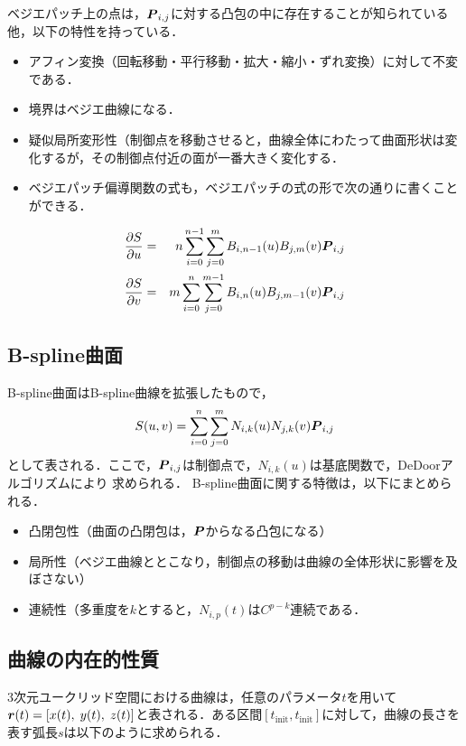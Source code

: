 		ベジエパッチ上の点は，$ \boldsymbol{P}_{i,j} $に対する凸包の中に存在することが知られている他，以下の特性を持っている．
		\begin{itemize}
			\item アフィン変換（回転移動・平行移動・拡大・縮小・ずれ変換）に対して不変である．
			\item 境界はベジエ曲線になる．
			\item 疑似局所変形性（制御点を移動させると，曲線全体にわたって曲面形状は変化するが，その制御点付近の面が一番大きく変化する．
			\item ベジエパッチ偏導関数の式も，ベジエパッチの式の形で次の通りに書くことができる．
		\end{itemize}
		\begin{eqnarray}
			\frac{\partial S}{\partial u} &=& n \sum_{i=0}^{n-1} \sum_{j=0}^m B_{i,n-1}(u) B_{j,m}(v) \boldsymbol{P}_{i,j}\\
			\frac{\partial S}{\partial v} &=& m \sum_{i=0}^{n} \sum_{j=0}^{m-1} B_{i,n}(u) B_{j,m-1}(v) \boldsymbol{P}_{i,j}
		\end{eqnarray}

		\subsection{B-spline曲面}
		B-spline曲面はB-spline曲線を拡張したもので，
		\begin{equation}\label{eq:BsplinePatch}
			S(u,v) = \sum_{i=0}^n \sum_{j=0}^m N_{i,k}(u) N_{j,k}(v) \boldsymbol{P}_{i,j}
 		\end{equation}
 		として表される．ここで，$ \boldsymbol{P}_{i,j} $は制御点で，$ N_{i,k}(u) $は基底関数で，DeDoorアルゴリズムにより
 		求められる．
 		B-spline曲面に関する特徴は，以下にまとめられる．
 		\begin{itemize}
 			\item 凸閉包性（曲面の凸閉包は，$ \boldsymbol{P} $からなる凸包になる）
 			\item 局所性（ベジエ曲線ととこなり，制御点の移動は曲線の全体形状に影響を及ぼさない）
 			\item 連続性（多重度を$ k $とすると，$ N_{i,p}(t) $は$ C^{p-k} $連続である．
 		\end{itemize}
 \subsection{曲線の内在的性質}
 	3次元ユークリッド空間における曲線は，任意のパラメータ$ t $を用いて$ \boldsymbol{r}(t) = [x(t),\;y(t),\;z(t)] $と表される．ある区間$ [t_{\mathrm{init}},t_{\mathrm{init}}] $に対して，曲線の長さを表す弧長$ s $は以下のように求められる．
 	
